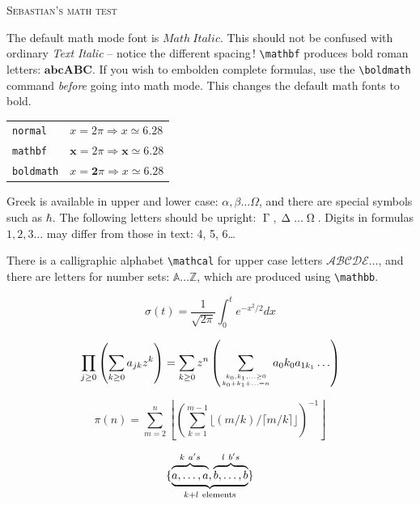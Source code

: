 \documentclass{article}
\begin{document}
\begin{center}
  \scshape\Large Sebastian's math test\\
\end{center}
The default math mode font is $Math\ Italic$. This should not be
confused with ordinary \emph{Text Italic} -- notice the different spacing\,!
\verb|\mathbf| produces bold roman letters: $ \mathbf{abcABC} $.
If you wish to embolden complete formulas,
use the \verb|\boldmath| command \emph{before} going into math mode.  
This changes the default math fonts to bold. 
 
\begin{tabular}{ll}
\texttt{normal}   & $ x = 2\pi \Rightarrow x \simeq 6.28 $\\
\texttt{mathbf}   & $\mathbf{x} = 2\pi \Rightarrow \mathbf{x} \simeq 6.28 $\\
\texttt{boldmath} & {\boldmath $x = \mathbf{2}\pi \Rightarrow x 
                    \simeq{\mathbf{6.28}}              $}\\
\end{tabular}
\smallskip

Greek is available in upper and lower case:
$\alpha,\beta \dots \Omega$, and there are special
symbols such as $ \hbar$.
The following letters should be upright: $\upGamma, \upDelta\dots \upOmega$.
Digits in formulas $1, 2, 3\dots$ may differ from those in text: 4, 5, 6\dots

There is a calligraphic alphabet \verb|\mathcal| for upper case letters
$ \mathcal{ABCDE}\dots $, and there are letters for number sets: $\mathbb{A\dots Z} $,
which are produced using \verb|\mathbb|.
 
\begin{equation}
  \sigma(t)=\frac{1}{\sqrt{2\pi}}
  \int^t_0 e^{-x^2/2} dx 
\end{equation}

\begin{equation}
  \prod_{j\geq 0}
  \left(\sum_{k\geq 0}a_{jk} z^k\right) 
= \sum_{k\geq 0} z^n
  \left( \sum_{{k_0,k_1,\ldots\geq 0}
          \atop{k_0+k_1+\ldots=n}    }
        a{_0k_0}a_{1k_1}\ldots  \right) 
\end{equation}

\begin{equation}
\pi(n) = \sum_{m=2}^{n}
  \left\lfloor \left(\sum_{k=1}^{m-1}
       \lfloor(m/k)/\lceil m/k\rceil 
       \rfloor \right)^{-1}
  \right\rfloor
\end{equation}

\begin{equation}
\{\underbrace{%
    \overbrace{\mathstrut a,\ldots,a}^{k\ a's},
    \overbrace{\mathstrut b,\ldots,b}^{l\ b's}}
  _{k+l\ \mathrm{elements}}                   \}
\end{equation}
\end{document}
